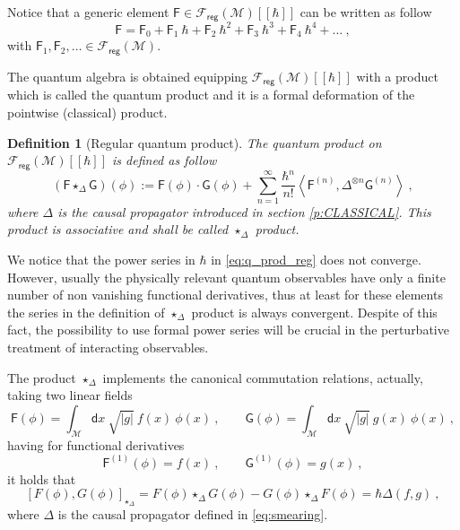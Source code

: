 \documentclass[11pt]{book}
\newcommand{\reg}{\mathsf{reg}}
\newcommand{\abs}[1]{\left|#1\right|}
\newcommand{\sm}[1]{\left\langle#1\right\rangle}
\newcommand{\Fcal}{\mathcal{F}}
\newcommand{\Mcal}{\mathcal{M}}
\newcommand{\Fsf}{\mathsf{F}}
\newcommand{\Gsf}{\mathsf{G}}
\newcommand{\dsf}{\mathsf{d}}
\theoremstyle{break}
\newtheorem{definition}{Definition}[chapter]
\begin{document}
Notice that a generic element $\Fsf \in \Fcal_\reg(\Mcal)[[\hbar]]$ can be written as follow
%
\begin{equation*}
\Fsf = \Fsf_0 + \Fsf_1 \ \hbar + \Fsf_2 \ \hbar^2 + \Fsf_3 \ \hbar^3 + \Fsf_4 \ \hbar^4 + \dots \ ,
\end{equation*}
%
with $\Fsf_1, \Fsf_2, \dots \in \Fcal_\reg(\Mcal)$. 


The quantum algebra is obtained equipping $\Fcal_\reg(\Mcal)[[\hbar]]$ with a product which is called the quantum product and it is a formal deformation of the pointwise (classical) product.


\begin{definition}[Regular quantum product]
The quantum product on $\Fcal_\reg(\Mcal)[[\hbar]]$ is defined as follow
%
\begin{equation}
(\Fsf \star_\Delta \Gsf)(\phi) := \Fsf(\phi) \cdot \Gsf(\phi) + \sum_{n=1}^\infty \frac{\hbar^n}{n!} \sm{ \Fsf^{(n)} , \Delta^{\otimes n} \Gsf^{(n) } } \ ,
\label{eq:q_prod_reg}
\end{equation}
%
where $\Delta$ is the causal propagator introduced in section \ref{p:CLASSICAL}. This product is associative and shall be called $\star_\Delta$ product.
\end{definition}


We notice that the power series in $\hbar$ in \eqref{eq:q_prod_reg} does not converge. However, usually the physically relevant quantum observables have only a finite number of non vanishing functional derivatives, thus at least for these elements the series in the definition of $\star_\Delta$ product is always convergent. Despite of this fact, the possibility to use formal power series will be crucial in the perturbative treatment of interacting observables.


\bigskip


The product $\star_\Delta$ implements the canonical commutation relations, actually, taking two linear fields 
%
\begin{equation*}
\Fsf(\phi) = \int_\Mcal \dsf x \ \sqrt{\abs{g}} \ f(x) \ \phi(x) \ , \qquad \Gsf(\phi) = \int_\Mcal \dsf x \ \sqrt{\abs{g}} \ g(x) \ \phi(x) \ ,
\end{equation*}
%
having for functional derivatives
%
\begin{equation*}
\Fsf^{(1)}(\phi) = f(x) \ , \qquad \Gsf^{(1)}(\phi) = g(x) \ ,
\end{equation*}
%
it holds that 
%
\begin{equation}
\left[F(\phi),G(\phi)\right]_{\star_\Delta} =  F(\phi) \star_\Delta G(\phi) - G(\phi) \star_\Delta F(\phi) =  \hbar \Delta(f,g) \ ,
\label{eq:ccr_linear}
\end{equation}
%
where $\Delta$ is the causal propagator defined in \eqref{eq:smearing}.
\end{document}
